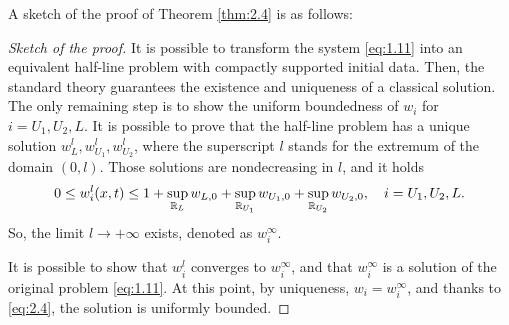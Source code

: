 A sketch of the proof of Theorem \ref{thm:2.4} is as follows:
\begin{proof}[Sketch of the proof]
    It is possible to transform the system \ref{eq:1.11} into an equivalent half-line problem with compactly supported initial data. Then, the standard theory guarantees the existence and uniqueness of a classical solution. The only remaining step is to show the uniform boundedness of \(w_i\) for \(i = U_1, U_2, L\).
    It is possible to prove that the half-line problem has a unique solution \(w_L^l, w_{U_1}^l, w_{U_2}^l\), where the superscript \(l\) stands for the extremum of the domain \((0, l)\). Those solutions are nondecreasing in \(l\), and it holds 
    \begin{equation}
        0 \leq w_i^l(x,t) \leq 1 + \sup_{\mathbb{R}_L} w_{L,0} + \sup_{\mathbb{R}_{U_1}} w_{U_1,0} + \sup_{\mathbb{R}_{U_2}} w_{U_2,0}, \quad i = U_1, U_2, L.
        \label{eq:2.4}
    \end{equation}
    So, the limit \(l \to +\infty\) exists, denoted as \(w_i^\infty\).

    It is possible to show that \(w_i^l\) converges to \(w_i^\infty\), and that \(w_i^\infty\) is a solution of the original problem \ref{eq:1.11}. 
    At this point, by uniqueness, \(w_i = w_i^\infty\), and thanks to \eqref{eq:2.4}, the solution is uniformly bounded.
\end{proof}


